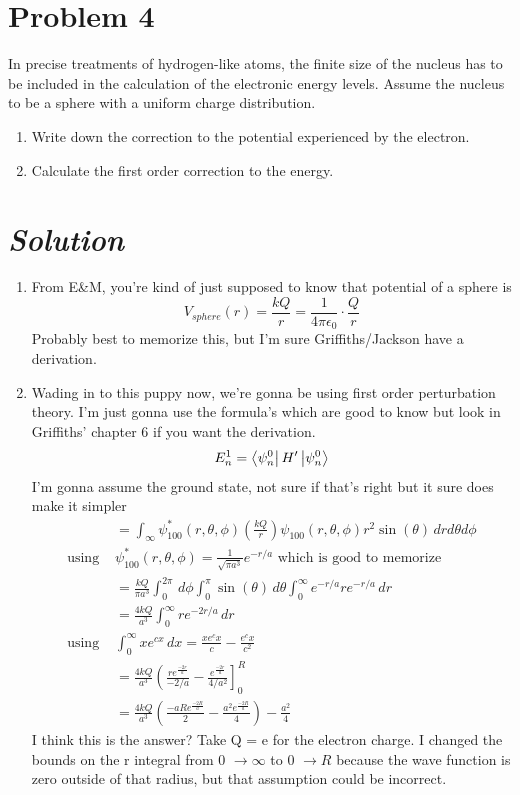 \documentclass{article}
\begin{document}
\section*{Problem 4}	 
In precise treatments of hydrogen-like atoms, the finite size of the nucleus has to be included in the calculation of the electronic energy levels. Assume the nucleus to be a sphere with a uniform charge distribution.
\begin{enumerate}[label=\alph*)]
	\item %
	Write down the correction to the potential experienced by the electron.
	\item %
	Calculate the first order correction to the energy.
\end{enumerate}
\section*{\textit{Solution}} 
\begin{enumerate}[label=\alph*)]
	\item %
	From E\&M, you're kind of just supposed to know that potential of a sphere is 
	\[ V_{sphere} (r) = \frac{kQ}{r} = \frac{1}{4\pi\epsilon_0} \cdot \frac{Q}{r}\]
	Probably best to memorize this, but I'm sure Griffiths/Jackson have a derivation.
	\item  %
	Wading in to this puppy now, we're gonna be using first order perturbation theory. I'm just gonna use the formula's which are good to know but look in Griffiths' chapter 6 if you want the derivation.
	\[
	E^1_n = \bra{\psi^0_n}H'\ket{\psi^0_n}
	\]
I'm gonna assume the ground state, not sure if that's right but it sure does make it simpler
	\begin{align}
	&= \int_\infty \psi^{*}_{100}(r,\theta,\phi)\left(\frac{kQ}{r}\right)\psi_{100}(r,\theta,\phi)r^2\sin(\theta)\,drd\theta d\phi \\ 
	\text{using } &\psi^{*}_{100}(r,\theta,\phi) = \frac{1}{\sqrt{\pi a^3}}e^{-r/a} \text{ which is good to memorize} \\
	&= \frac{kQ}{\pi a^3} \int_0^{2\pi}\,d\phi\int_0^{\pi} \sin(\theta)\,d\theta\int_0^\infty e^{-r/a}re^{-r/a} \,dr \\ 
	&= \frac{4kQ}{a^3} \int_0^\infty re^{-2r/a} \,dr \\ 
	\text{using }& \int_0^\infty xe^{cx} \,dx = \frac{xe^cx}{c} - \frac{e^cx}{c^2} \\
	&= \frac{4kQ}{a^3} \left( \frac{re^{\frac{-2r}{a}}}{-2/a} - \frac{e^{\frac{-2r}{a}}}{4/a^2}\right]_0^R \\ 
	&= \frac{4kQ}{a^3} \left( \frac{-aRe^{\frac{-2R}{a}}}{2} - \frac{a^2e^{\frac{-2R}{a}}}{4}\right) - \frac{a^2}{4}
	\end{align}
	I think this is the answer? Take Q = e for the electron charge. I changed the bounds on the r integral from 0 $\rightarrow \infty$ to 0 $\rightarrow R$ because the wave function is zero outside of that radius, but that assumption could be incorrect.
\end{enumerate}
\end{document}
